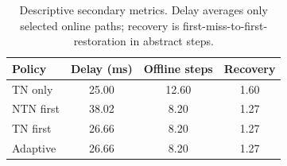 \begin{table}[t]
\centering
\caption{Descriptive secondary metrics. Delay averages only selected online paths; recovery is first-miss-to-first-restoration in abstract steps.}
\label{tab:secondary}
\footnotesize
\begin{tabular}{lccc}\toprule
Policy & Delay (ms) & Offline steps & Recovery \\ \midrule
TN only & 25.00 & 12.60 & 1.60 \\
NTN first & 38.02 & 8.20 & 1.27 \\
TN first & 26.66 & 8.20 & 1.27 \\
Adaptive & 26.66 & 8.20 & 1.27 \\
\bottomrule\end{tabular}
\end{table}
